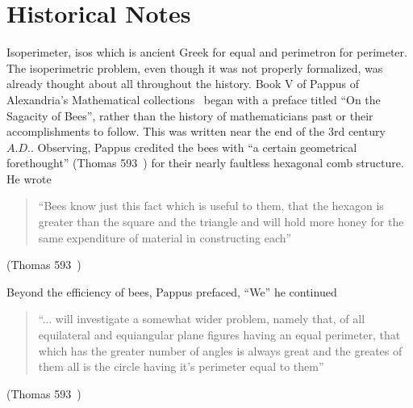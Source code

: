 \documentclass[a4paper]{book}
\numberwithin{theorem}{section}%
\begin{document}
\chapter{Historical Notes}
Isoperimeter, isos which is ancient Greek for equal and perimetron for perimeter. The isoperimetric problem, even though it was not properly formalized, was already thought about all throughout the history. 
\newline
\newline
Book V of Pappus of Alexandria's Mathematical collections~\citep{wiegert2010sagacity} began with a preface titled ``On the Sagacity of Bees'', rather than the history of mathematicians past or their accomplishments to follow. This was written near the end of the 3rd century $A.D.$. Observing, Pappus credited the bees with ``a certain geometrical forethought'' (Thomas 593~\citep{ivor1941selections}) for their nearly faultless hexagonal comb structure. He wrote
\begin{center}
    \begin{quote}
        ``Bees know just this fact which is useful to them, that 
        the hexagon is greater than the square and the triangle 
        and will hold more honey for the same expenditure of 
        material in constructing each''
    \end{quote}
    (Thomas 593~\citep{ivor1941selections})
\end{center}
Beyond the efficiency of bees, Pappus prefaced, ``We'' he continued
\begin{center}
    \begin{quote}
        ``... will {}investigate a somewhat wider problem, namely that, 
        of all equilateral and equiangular plane figures having an equal 
        perimeter, that which has the greater number of angles is always great 
        and the greates of them all is the circle having it's perimeter equal to them''
    \end{quote}
    (Thomas 593~\citep{ivor1941selections})
\end{center}
\end{document}
